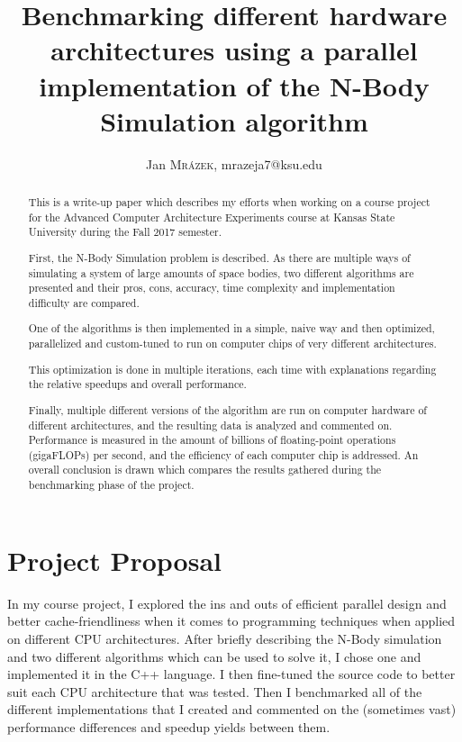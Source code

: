 \documentclass[journal]{IEEEtran}
\begin{document}
	
	\title{Benchmarking different hardware architectures using a parallel implementation of the N-Body Simulation algorithm}
	\author{{Jan \textsc{Mrázek}}, {mrazeja7@ksu.edu}}
	
	\maketitle
	
	\begin{abstract}
		
		This is a write-up paper which describes my efforts when working on a course project for the Advanced Computer Architecture Experiments course at Kansas State University during the Fall 2017 semester.
		
		First, the N-Body Simulation problem is described. As there are multiple ways of simulating a system of large amounts of space bodies, two different algorithms are presented and their pros, cons, accuracy, time complexity and implementation difficulty are compared. 
		
		One of the algorithms is then implemented in a simple, naive way and then optimized, parallelized and custom-tuned to run on computer chips of very different architectures. 
		
		This optimization is done in multiple iterations, each time with explanations regarding the relative speedups and overall performance.
		
		Finally, multiple different versions of the algorithm are run on computer hardware of different architectures, and the resulting data is analyzed and commented on. Performance is measured in the amount of billions of floating-point operations (gigaFLOPs) per second, and the efficiency of each computer chip is addressed. An overall conclusion is drawn which compares the results gathered during the benchmarking phase of the project.
		
	\end{abstract}

	\section{Project Proposal}
		
		In my course project, I explored the ins and outs of efficient parallel design and better cache-friendliness when it comes to programming techniques when applied on different CPU architectures. After briefly describing the N-Body simulation and two different algorithms which can be used to solve it, I chose one and implemented it in the C++ language. I then fine-tuned the source code to better suit each CPU architecture that was tested. Then I benchmarked all of the different implementations that I created and commented on the (sometimes vast) performance differences and speedup yields between them.	
	
\end{document}
